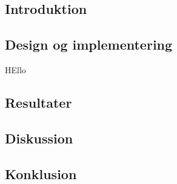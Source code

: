 \documentclass[../journal2.tex]{subfiles}
\begin{document}
\subsection{Introduktion}

\subsection{Design og implementering}

\begin{table}[tbp]
    \centering
      \framebox{
        \rule{8pt}{0pt}
          
  }
  \caption{HEllo}
  \label{src:Ex2}
\end{table}

\subsection{Resultater}

\subsection{Diskussion}

\subsection{Konklusion}
\end{document}
